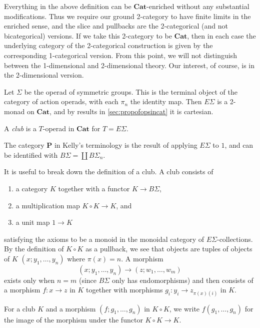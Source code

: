 \documentclass{amsbook} %
\newcommand{\mb}{\mathbf}
\numberwithin{section}{chapter}
\begin{document}
\begin{rem}
Everything in the above definition can be $\mb{Cat}$-enriched without any substantial modifications.  Thus we require our ground 2-category to have finite limits in the enriched sense, and the slice and pullbacks are the 2-categorical (and not bicategorical) versions.  If we take this 2-category to be $\mb{Cat}$, then in each case the underlying category of the 2-categorical construction is given by the corresponding 1-categorical version.  From this point, we will not distinguish between the 1-dimensional and 2-dimensional theory.  Our interest, of course, is in the 2-dimensional version.
\end{rem}

Let $\Sigma$ be the operad of symmetric groups.  This is the terminal object of the category of action operads, with each $\pi_{n}$ the identity map.  Then $E\Sigma$ is a 2-monad on $\mb{Cat}$, and by results in \cref{sec:propofopsincat} it is cartesian.

\begin{Defi}
A \textit{club} is a $T$-operad in $\mb{Cat}$ for $T = E\Sigma$.
\end{Defi}

\begin{rem}
The category $\mb{P}$ in Kelly's terminology is the result of applying $E\Sigma$ to $1$, and can be identified with $B\Sigma = \coprod B\Sigma_{n}$.
\end{rem}

It is useful to break down the definition of a club.  A club consists of
\begin{enumerate}
\item a category $K$ together with a functor $K \rightarrow B \Sigma$,
\item a multiplication map $K \circ K \rightarrow K$, and
\item a unit map $1 \rightarrow K$
\end{enumerate}
satisfying the axioms to be a monoid in the monoidal category of $E\Sigma$-collections.  By the definition of $K \circ K$ as a pullback, we see that objects are tuples of objects of $K$ $(x; y_{1}, \ldots, y_{n})$ where $\pi(x) = n$.  A morphism
\[
(x; y_{1}, \ldots, y_{n}) \to (z; w_{1}, \ldots, w_{m})
\]
exists only when $n=m$ (since $B\Sigma$ only has endomorphisms) and then consists of a morphism $f \colon x \to z$ in $K$ together with morphisms $g_{i} \colon y_{i} \to z_{\pi(x)(i)}$ in $K$.

\begin{nota}\label{nota:clubmult}
For a club $K$ and a morphism $(f; g_{1}, \ldots, g_{n})$ in $K \circ K$, we write $f(g_{1}, \ldots, g_{n})$ for the image of the morphism under the functor $K \circ K \rightarrow K$.
\end{nota}
\end{document}
